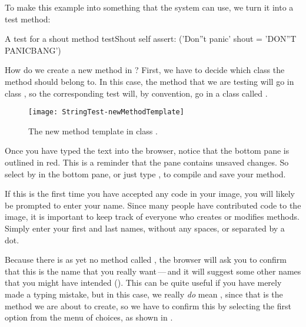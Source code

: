 \documentclass[a4paper,10pt,twoside]{book}
\begin{document}
\noindent
To make this example into something that the system can use, we turn it into a test method:

\begin{method}[testShout]{A test for a shout method}
testShout
	self assert: ('Don''t panic' shout = 'DON''T PANICBANG')
\end{method} %

How do we create a new method in \pharo?   First, we have to decide which class the method should belong to.
In this case, the  method that we are testing will go in class , so the corresponding test will, by convention, go in a class called .

\begin{figure}[hbt]
\centerline {\texttt{[image: StringTest-newMethodTemplate]}}
\caption{The new method template in class .
}
\end{figure}

Once you have typed the text into the browser, notice that the bottom pane is outlined in red.  This is a reminder that the pane contains unsaved changes.
So select  by  in the bottom pane, or just type , to compile and save your method.

If this is the first time you have accepted any code in your image, you will likely be prompted to enter your name. Since many people have contributed code to the image, it is important to keep track of everyone who creates or modifies methods. Simply enter your first and last names, without any spaces, or separated by a dot.


Because there is as yet no method called , the browser will ask you to confirm that this is the name that you really want\,---\,and it will suggest some other names that you might have intended ().
This can be quite useful if you have merely made a typing mistake, but in this case, we really \emph{do} mean , since that is the method we are about to create, so we have to confirm this by selecting the first option from the menu of choices, as shown in . 
\end{document}
